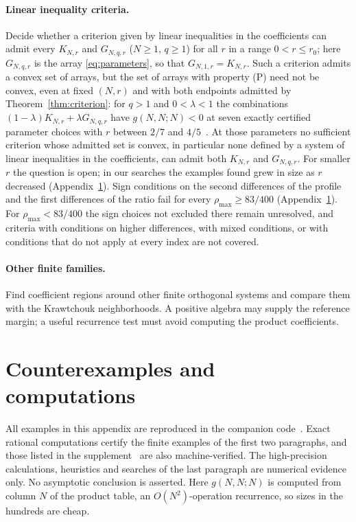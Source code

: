 \paragraph{Linear inequality criteria.}
Decide whether a criterion given by linear inequalities in the coefficients can admit every $K_{N,r}$ and $G_{N,q,r}$ ($N\geq1$, $q\geq1$) for all $r$ in a range $0<r\leq r_0$; here $G_{N,q,r}$ is the array \eqref{eq:parameters}, so that $G_{N,1,r}=K_{N,r}$. Such a criterion admits a convex set of arrays, but the set of arrays with property (P) need not be convex, even at fixed $(N,r)$ and with both endpoints admitted by Theorem~\ref{thm:criterion}: for $q>1$ and $0<\lambda<1$ the combinations $(1-\lambda)K_{N,r}+\lambda G_{N,q,r}$ have $g(N,N;N)<0$ at seven exactly certified parameter choices with $r$ between $2/7$ and $4/5$~\cite[Section~]{P1}. At those parameters no sufficient criterion whose admitted set is convex, in particular none defined by a system of linear inequalities in the coefficients, can admit both $K_{N,r}$ and $G_{N,q,r}$. For smaller $r$ the question is open; in our searches the examples found grew in size as $r$ decreased (Appendix~\ref{app:computations}). Sign conditions on the second differences of the profile and the first differences of the ratio fail for every $\rho_{\max}\geq83/400$ (Appendix~\ref{app:computations}). For $\rho_{\max}<83/400$ the sign choices not excluded there remain unresolved, and criteria with conditions on higher differences, with mixed conditions, or with conditions that do not apply at every index are not covered.

\paragraph{Other finite families.}
Find coefficient regions around other finite orthogonal systems and compare them with the Krawtchouk neighborhoods. A positive algebra may supply the reference margin; a useful recurrence test must avoid computing the product coefficients.


\appendix
\section{Counterexamples and computations}\label{app:computations}

All examples in this appendix are reproduced in the companion code~\cite{code}. Exact rational computations certify the finite examples of the first two paragraphs, and those listed in the supplement~\cite{supp} are also machine-verified. The high-precision calculations, heuristics and searches of the last paragraph are numerical evidence only. No asymptotic conclusion is asserted. Here $g(N,N;N)$ is computed from column $N$ of the product table, an $O(N^2)$-operation recurrence, so sizes in the hundreds are cheap.

